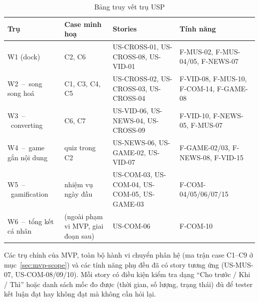 \begin{table}[H]
\caption{Bảng truy vết trụ USP}
\label{tab:usp-trace}
\centering
\begin{tabularx}{\textwidth}{>{\raggedright\arraybackslash}p{2.6cm} >{\raggedright\arraybackslash}X >{\raggedright\arraybackslash}X >{\raggedright\arraybackslash}p{4.6cm}}
\toprule
\textbf{Trụ} & \textbf{Case minh hoạ} & \textbf{Stories} & \textbf{Tính năng} \\
\midrule
W1 (dock) & C2, C6 & US-CROSS-01, US-CROSS-08, US-VID-01 & F-MUS-02, F-MUS-04/05, F-NEWS-07 \\
W2~--~song song hoá & C1, C3, C4, C5 & US-CROSS-02, US-CROSS-03, US-CROSS-04 & F-VID-08, F-MUS-10, F-COM-14, F-GAME-08 \\
W3~--~converting & C6, C7 & US-VID-06, US-NEWS-04, US-CROSS-09 & F-VID-10, F-NEWS-05, F-MUS-07 \\
W4~--~game gắn nội dung & quiz trong C2 & US-NEWS-06, US-GAME-02, US-VID-07 & F-GAME-02/03, F-NEWS-08, F-VID-15 \\
W5~--~gamification & nhiệm vụ ngày đầu & US-COM-03, US-COM-04, US-COM-05, US-GAME-03 & F-COM-04/05/06/07/15 \\
W6~--~tổng kết cá nhân & (ngoài phạm vi MVP, giai đoạn sau) & US-COM-06 & F-COM-10 \\
\bottomrule
\end{tabularx}
\end{table}

Các trụ chính của MVP, toàn bộ hành vi chuyển phân hệ (ma trận case C1--C9 ở mục~\ref{sec:mvp-scope}) và các tính năng phụ đều đã có story tương ứng (US-MUS-07, US-COM-08/09/10). Mỗi story có điều kiện kiểm tra dạng ``Cho trước / Khi / Thì'' hoặc danh sách mốc đo được (thời gian, số lượng, trạng thái) đủ để tester kết luận đạt hay không đạt mà không cần hỏi lại.
